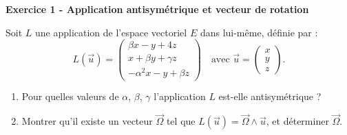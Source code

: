 \documentclass[12pt,a4paper]{article}
\begin{document}
\begin{boiteexercice}
\textbf{Exercice 1 - Application antisymétrique et vecteur de rotation}\niveau{\moyen}

Soit $L$ une application de l'espace vectoriel $E$ dans lui-même, définie par :
\[
L(\vec{u}) = \begin{pmatrix} \beta x - y + 4z \\ x + \beta y + \gamma z \\ -\alpha^2 x - y + \beta z \end{pmatrix}
\quad \text{avec } \vec{u} = \begin{pmatrix} x \\ y \\ z \end{pmatrix}.
\]
\begin{enumerate}
  \item Pour quelles valeurs de $\alpha$, $\beta$, $\gamma$ l'application $L$ est-elle antisymétrique ?
  \item Montrer qu'il existe un vecteur $\vec{\Omega}$ tel que $L(\vec{u}) = \vec{\Omega} \wedge \vec{u}$, et déterminer $\vec{\Omega}$.
\end{enumerate}
\end{boiteexercice}
\end{document}
